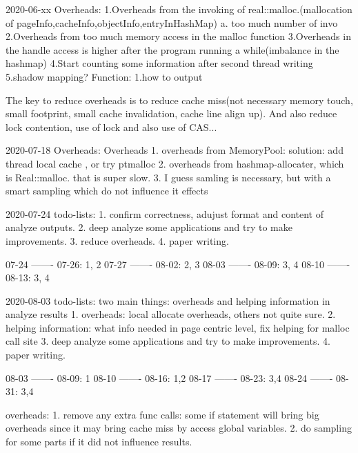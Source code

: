 2020-06-xx
Overheads:
1.Overheads from the invoking of real::malloc.(mallocation of pageInfo,cacheInfo,objectInfo,entryInHashMap)
a. too much number of invo
2.Overheads from too much memory access in the malloc function
3.Overheads in the handle access is higher after the program running a while(imbalance in the hashmap)
4.Start counting some information after second thread writing
5.shadow mapping?
Function:
1.how to output

The key to reduce overheads is to reduce cache miss(not necessary memory touch, small footprint, small cache invalidation, cache line align up).
And also reduce lock contention, use of lock and also use of CAS...


2020-07-18 Overheads:
Overheads
1. overheads from MemoryPool:
solution: add thread local cache , or try ptmalloc
2. overheads from hashmap-allocater, which is Real::malloc. that is super slow.
3. I guess samling is necessary, but with a smart sampling which do not influence it effects




2020-07-24 todo-lists:
1. confirm correctness, adujust format and content of analyze outputs.
2. deep analyze some applications and try to make improvements.
3. reduce overheads.
4. paper writing.

07-24 ------- 07-26: 1, 2
07-27 ------- 08-02: 2, 3
08-03 ------- 08-09: 3, 4
08-10 ------- 08-13: 3, 4

2020-08-03 todo-lists:
two main things: overheads and helping information in analyze results
    1. overheads: local allocate overheads, others not quite sure.
    2. helping information: what info needed in page centric level, fix helping for malloc call site
    3. deep analyze some applications and try to make improvements.
    4. paper writing.

08-03 ------- 08-09: 1
08-10 ------- 08-16: 1,2
08-17 ------- 08-23: 3,4
08-24 ------- 08-31: 3,4


overheads:
    1. remove any extra func calls: some if statement will bring big overheads since it may bring cache miss by access global variables.
    2. do sampling for some parts if it did not influence results.
